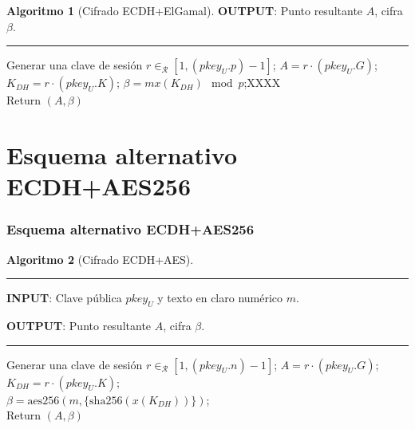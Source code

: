 \documentclass{beamer}
\theoremstyle{plain}        			%
\theoremstyle{definition}   			%
\theoremstyle{saltolinea}   			%
\newtheorem{algo}{Algoritmo}
\begin{document}
\begin{frame}
\begin{overlayarea}{\textwidth}{6.65cm}
{\begin{algo}[Cifrado ECDH+ElGamal]
{	{\bf OUTPUT}: Punto resultante $A$, cifra $\beta$.
	\hrule
	}%
	\vspace{-.5cm}
	\begin{algorithmic}[1]
	\STATE Generar una clave de sesi\'on $r\in_{\mathcal{R}}\left[1,\left(pkey_U.p\right)-1\right]$;
	\STATE $A=r\cdot (pkey_U.G)$;
	\STATE $K_{DH}=r\cdot (pkey_U.K)$; 
	\STATE $\beta=mx(K_{DH})\mod p$;{\red \!\!\!\!\!\!\!\!\!\!\!\!\!\!\!\!\!\!XXXX} \\
	\STATE Return $(A,\beta)$
	\end{algorithmic}
	\end{algo}}
	\vspace{-.5cm}
	\end{overlayarea}
\end{frame}


\section{Esquema alternativo ECDH+AES256}

\begin{frame}
\frametitle{Esquema alternativo ECDH+AES256}
	\pause
	\begin{algo}[Cifrado ECDH+AES]\label{alg:AES}
	\parbox[b]{\linewidth}{%
	\hrule
	\smallskip
	{\bf INPUT}: Clave p\'ublica $pkey_U$ y texto en claro num\'erico $m$.
	
	{\bf OUTPUT}: Punto resultante $A$, cifra $\beta$.
	\hrule
	}%
	\begin{algorithmic}[1]
	\STATE Generar una clave de sesi\'on $r\in_{\mathcal{R}}\left[1,\left(pkey_U.n\right)-1\right]$;
	\STATE $A=r\cdot (pkey_U.G)$;
	\STATE $K_{DH}=r\cdot (pkey_U.K)$;\\
	\STATE $\beta=\textrm{aes256}(m,\{\textrm{sha256}(x(K_{DH}))\})$;\\
	\STATE Return $(A,\beta)$
	\end{algorithmic}
	\end{algo}
\end{frame}
\end{document}
